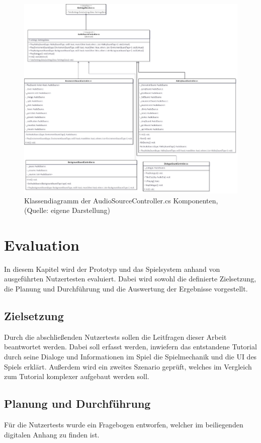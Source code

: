 \begin{figure}[ht]
\centering
\includegraphics[width=1\linewidth]{content/pictures/AudioSourceController.jpg}
\caption{Klassendiagramm der AudioSourceController.cs Komponenten, (Quelle: eigene Darstellung)}
\label{fig:audio-source-controller}
\end{figure}

\chapter{Evaluation}\label{sec:test}
In diesem Kapitel wird der Prototyp und das Spielsystem anhand von ausgeführten Nutzertesten evaluiert. Dabei wird sowohl die definierte Zielsetzung, die Planung und Durchführung und die Auswertung der Ergebnisse vorgestellt.

\section{Zielsetzung}
Durch die abschließenden Nutzertests sollen die Leitfragen dieser Arbeit beantwortet werden. Dabei soll erfasst werden, inwiefern das entstandene Tutorial durch seine Dialoge und Informationen im Spiel die Spielmechanik und die \ac{UI} des Spiels erklärt. Außerdem wird ein zweites Szenario geprüft, welches im Vergleich zum Tutorial komplexer aufgebaut werden soll. 

\section{Planung und Durchführung}
Für die Nutzertests wurde ein Fragebogen entworfen, welcher im beiliegenden digitalen Anhang zu finden ist. 

